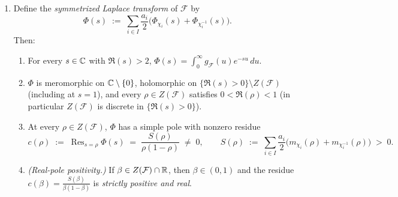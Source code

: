 \begin{proposition}
\begin{enumerate}[label=\textup{(\roman*)}]
\item Define the \emph{symmetrized Laplace transform} of $\mathcal{F}$ by
  \begin{equation}
  \label{eq:02:phi-sym}
    \Phi(s) \;:=\; \sum_{i \in I} \frac{a_i}{2}\bigl(\Phi_{\chi_i}(s) + \Phi_{\chi_i^{-1}}(s)\bigr).
  \end{equation}
  Then:
  \begin{enumerate}[label=\textup{(\alph*)}]
  \item For every $s \in \mathbb{C}$ with $\Re(s) > 2$, $\Phi(s) = \int_0^\infty g_{\mathcal{F}}(u) e^{-su}\,du$.
  \item $\Phi$ is meromorphic on $\mathbb{C} \setminus \{0\}$, holomorphic on $\{\Re(s) > 0\} \setminus Z(\mathcal{F})$ (including at $s=1$), and every $\rho \in Z(\mathcal{F})$ satisfies $0 < \Re(\rho) < 1$ (in particular $Z(\mathcal{F})$ is discrete in $\{\Re(s) > 0\}$).
  \item At every $\rho \in Z(\mathcal{F})$, $\Phi$ has a simple pole with nonzero residue
    \begin{equation}
    \label{eq:02:residue}
      c(\rho) \;:=\; \operatorname{Res}_{s=\rho}\Phi(s) \;=\; \frac{S(\rho)}{\rho(1-\rho)} \;\neq\; 0,
      \qquad S(\rho) \;:=\; \sum_{i \in I} \frac{a_i}{2}\bigl(m_{\chi_i}(\rho) + m_{\chi_i^{-1}}(\rho)\bigr) \;>\; 0.
    \end{equation}
  \item \emph{(Real-pole positivity.)} If $\beta \in Z(\mathcal{F}) \cap \mathbb{R}$, then $\beta \in (0, 1)$ and the residue $c(\beta) = \frac{S(\beta)}{\beta(1-\beta)}$ is \emph{strictly positive and real}.
  \end{enumerate}
\end{enumerate}
\end{proposition}

